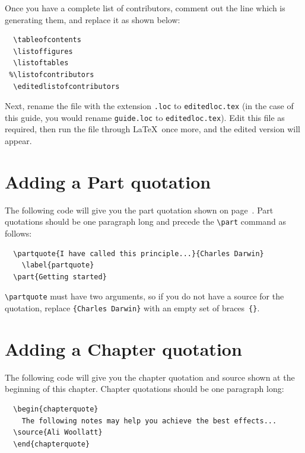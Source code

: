 Once you have a complete list of contributors, comment out the line which is generating them, and replace it as shown below:
\begin{verbatim}
  \tableofcontents
  \listoffigures
  \listoftables
 %\listofcontributors
  \editedlistofcontributors
\end{verbatim}
Next, rename the file with the extension \verb".loc" to \verb"editedloc.tex" (in the case of this guide, you would rename \texttt{\cambridge guide.loc} to \verb"editedloc.tex"). Edit this file as required, then run the file through \LaTeX\ once more, and the edited version will appear.

\section{Adding a Part quotation}
\label{partquotation}
The following code will give you the part quotation shown on page~\pageref{partquote}. Part quotations should be one paragraph long and precede the \verb"\part" command as follows:
\begin{verbatim}
  \partquote{I have called this principle...}{Charles Darwin}
    \label{partquote}
  \part{Getting started}
\end{verbatim}
\verb"\partquote" must have two arguments, so if you do not have a source for the quotation, replace \verb"{Charles Darwin}" with an empty set of braces~\verb"{}".

\section{Adding a Chapter quotation}
\label{chapterquote}
The following code will give you the chapter quotation and source shown at the beginning of this chapter. Chapter quotations should be one paragraph long:
\begin{verbatim}
  \begin{chapterquote}
    The following notes may help you achieve the best effects...
  \source{Ali Woollatt}
  \end{chapterquote}
\end{verbatim}


